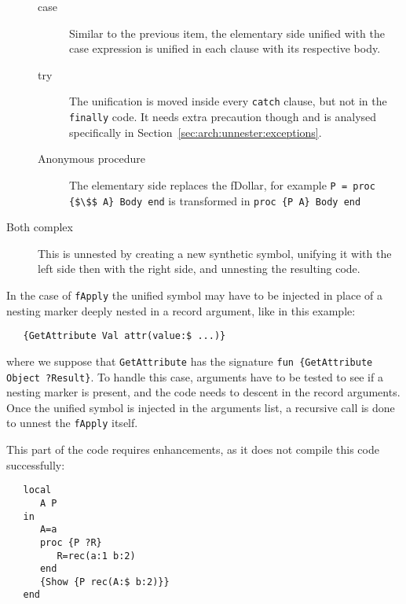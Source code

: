 \documentclass[a4paper]{memoir}
\begin{document}
\begin{description}
\begin{description}
      \item[case] Similar to the previous item, the elementary side  unified with the case expression is unified in each
        clause with its respective body.
      \item[try] The unification is moved inside every \lstinline!catch! clause, but not in
        the \lstinline!finally! code. It needs extra precaution though and is analysed specifically in
        Section~\ref{sec:arch:unnester:exceptions}.
      \item[Anonymous procedure] The elementary side replaces the fDollar, for
        example
        \lstinline[mathescape]!P = proc {$\$$ A} Body end! is transformed in
        \lstinline[mathescape]!proc {P A} Body end!
    \end{description}
  \item[Both complex] This is unnested by creating a new synthetic symbol, unifying it with the left side then with the right side, and unnesting the resulting code.
\end{description}

In the case of \lstinline!fApply! the unified
symbol may have to be injected in place of a nesting marker deeply nested in
a record argument, like in this example:

\begin{lstlisting}
   {GetAttribute Val attr(value:$ ...)}
\end{lstlisting}

where we suppose that \lstinline!GetAttribute! has the signature 
\lstinline!fun {GetAttribute Object ?Result}!.
To handle this case, arguments have to be tested to see if a nesting marker is
present, and the code needs to descent in the record arguments.
Once the unified symbol is injected in the arguments list, a recursive call is
done to unnest the \lstinline!fApply! itself.

This part of the code requires enhancements, as it does not compile this code successfully:

\begin{lstlisting}
   local
      A P
   in
      A=a
      proc {P ?R}
         R=rec(a:1 b:2)
      end
      {Show {P rec(A:$ b:2)}}
   end
\end{lstlisting}
\end{document}
